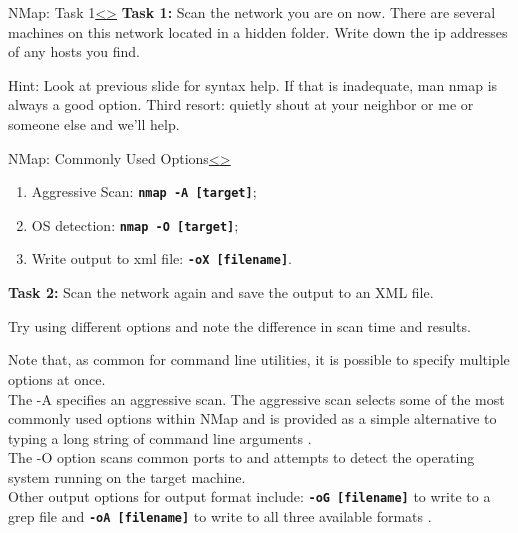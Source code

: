 \documentclass[12pt]{article}
\newcommand{\code}[1]{\texttt{\bfseries#1}}
\newenvironment{instructionblock}{\Large\bgroup}{\egroup}
\begin{document}
\pagebreak
\begin{slide}{NMap: Task 1}{\hyperref[slide 5]{\textless}\hyperref[slide 7]{\textgreater}}
   \begin{instructionblock}
    \textbf{Task 1:} Scan the network you are on now. There are several machines on this network located in a hidden folder. Write down the ip addresses of any hosts you find.
   \end{instructionblock}
\end{slide}

Hint: Look at previous slide for syntax help. If that is inadequate, man nmap is always a good option. Third resort: quietly shout at your neighbor or me or someone else and we'll help.



\pagebreak
\begin{slide}{ NMap: Commonly Used Options}{\hyperref[slide 6]{\textless}\hyperref[slide 8]{\textgreater}}
   \begin{instructionblock}
      \begin{enumerate}
\item Aggressive Scan: \code{nmap -A [target]};
\item OS detection: \code{nmap -O [target]};
\item Write output to xml file: \code{-oX [filename]}.
      \end{enumerate}
\textbf{Task 2:} Scan the network again and save the output to an XML file.

\vspace{16mm}
Try using different options and note the difference in scan time and results.
   \end{instructionblock}
\end{slide}
Note that, as common for command line utilities, it is possible to specify multiple options at once.\\

The -A specifies an aggressive scan. The aggressive scan selects some of the most commonly used options within  NMap and is provided as a simple alternative to typing a long string of command line arguments \cite{cookbook}. \\

The -O option scans common ports to and attempts to detect the operating system running on the target machine. \\

Other output options for output format include: \code{-oG [filename]} to write to a grep file and \code{-oA [filename]} to write to all three available formats \cite{rtfm}. \\
\end{document}
